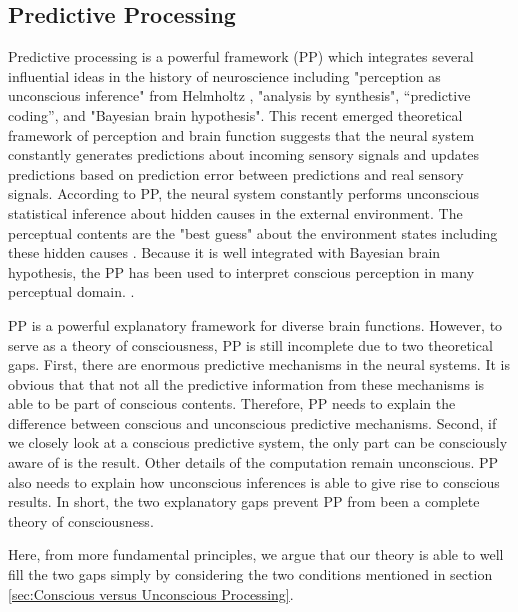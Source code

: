 \documentclass[utf8]{article}
\begin{document}
		\subsection{Predictive Processing}
    		Predictive processing is a powerful framework (PP) which integrates several influential ideas in the history of neuroscience including "perception as unconscious inference" from Helmholtz \citet{helmholtz1866concerning}, "analysis by synthesis", “predictive coding”, and "Bayesian brain hypothesis". This recent emerged theoretical framework of perception and brain function suggests that the neural system constantly generates predictions about incoming sensory signals and updates predictions based on prediction error between predictions and real sensory signals. According to PP, the neural system constantly performs unconscious statistical inference about hidden causes in the external environment. The perceptual contents are the "best guess" about the environment states including these hidden causes \citep{clark_2013, Hohwy2013}. Because it is well integrated with Bayesian brain hypothesis, the PP has been used to interpret conscious perception in many perceptual domain. \cite{Hohwy2013} \cite{SethPP2014}.
    		
    		
    		PP is a powerful explanatory framework for diverse brain functions. However, to serve as a theory of consciousness, PP is still incomplete due to two theoretical gaps. First, there are enormous predictive mechanisms in the neural systems. It is  obvious that that not all the predictive information from these mechanisms is able to be part of conscious contents. Therefore, PP needs to explain the difference between conscious and unconscious predictive mechanisms. Second, if we closely look at a conscious predictive system, the only part can be consciously aware of is the result. Other details of the computation remain unconscious. PP also needs to explain how unconscious inferences is able to give rise to conscious results. In short, the two explanatory gaps prevent PP from been a complete theory of consciousness. 
    		
    		Here, from more fundamental principles, we  argue that our theory is able to well fill the two gaps simply by considering the two conditions mentioned in section \ref{sec:Conscious versus Unconscious Processing}.
    		
\end{document}

